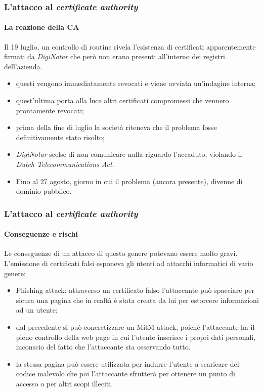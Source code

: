 \documentclass{beamer}
\begin{document}
\begin{frame}
\frametitle{L'attacco al \textit{certificate authority}}
\framesubtitle{La reazione della CA}
Il 19 luglio, un \alert{controllo di routine} rivela l'esistenza di certificati apparentemente firmati da \textit{DigiNotar} che però non erano presenti all'interno dei registri dell'azienda.
\begin{itemize}
	\item questi vengono immediatamente revocati e viene avviata un'indagine interna;
	\item quest'ultima porta alla luce altri \alert{certificati compromessi} che vennero prontamente revocati;
	\item prima della fine di luglio la società \alert{riteneva} che il \alert{problema} fosse definitivamente stato \alert{risolto};
	\item \textit{DigiNotar} scelse di \alert{non comunicare nulla} riguardo l'accaduto, violando il \textit{Dutch Telecommunications Act}.
	\item Fino al 27 agosto, giorno in cui il problema (ancora presente), divenne di dominio pubblico.
\end{itemize}
\end{frame}


\begin{frame}
\frametitle{L'attacco al \textit{certificate authority}}
\framesubtitle{Conseguenze e rischi}
Le \alert{conseguenze} di un attacco di questo genere potevano essere molto gravi. L'emissione di certificati falsi esponeva gli utenti ad attacchi informatici di vario genere:
\begin{itemize}
	\item \alert{Phishing attack}: attraverso un certificato falso l'attaccante può spacciare per sicura una pagina che in realtà è stata creata da lui per estorcere informazioni ad un utente;
	\item  dal precedente si può concretizzare un \alert{MitM attack}, poiché l'attaccante ha il pieno controllo della web page in cui l'utente inserisce i propri dati personali, inconscio del fatto che l'attaccante sta osservando tutto.
	\item la stessa pagina può essere utilizzata per indurre l'utente a scaricare del \alert{codice malevolo} che poi l'attaccante sfrutterà per ottenere un punto di accesso o per altri scopi illeciti.
\end{itemize}

\end{frame}
\end{document}
